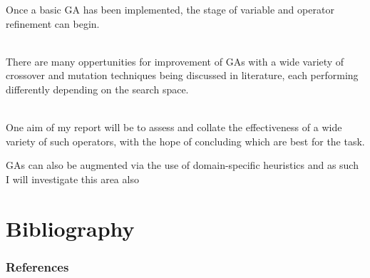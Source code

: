 \documentclass{beamer}
\begin{document}
\begin{frame}


    Once a basic GA has been implemented, the stage of variable and operator refinement can begin.
\\~\

    There are many oppertunities for improvement of GAs with a wide variety of crossover and mutation techniques being discussed in literature, each performing differently depending on the search space.
\\~\

    One aim of my report will be to assess and collate the effectiveness of a wide variety of such operators, with the hope of concluding which are best for the task. 

    GAs can also be augmented via the use of domain-specific heuristics and as such I will investigate this area also
\end{frame}

\section{Bibliography}
\begin{frame}[allowframebreaks]
\frametitle{References}


\end{frame}
\end{document}
